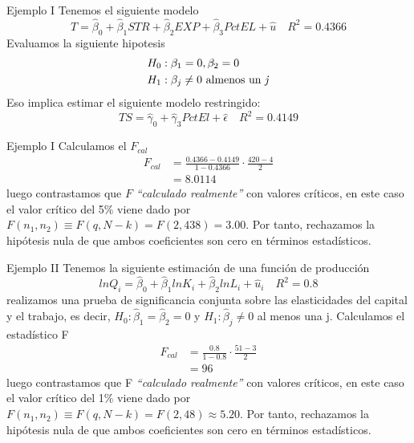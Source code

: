\begin{frame}{Ejemplo I}
	Tenemos el siguiente modelo
		$$T = \widehat{\beta}_0 + \widehat{\beta}_1 STR + \widehat{\beta}_2 EXP + \widehat{\beta}_3 PctEL + \widehat{u} \quad R^2=0.4366$$
	Evaluamos la siguiente hipotesis
	\begin{align*}
		H_0 &: \beta_1 = 0, \beta_2 = 0\\
		H_1 &: \beta_j \neq 0 \textup{ almenos un \textit{j}}
	\end{align*}
	Eso implica estimar el siguiente modelo restringido:
		$$TS = \widehat{\gamma}_0 + \widehat{\gamma}_3 PctEl + \widehat{\epsilon} \quad R^2 = 0.4149$$
\end{frame}
\begin{frame}{Ejemplo I}
	Calculamos el $F_{cal}$
		\begin{align*}
			F_{cal} & = \frac{0.4366 - 0.4149}{1 - 0.4366} \cdot \frac{420 - 4}{2} \\
			& = 8.0114
		\end{align*}
	luego contrastamos que $F$ \textit{``calculado realmente''} con valores críticos, en este caso el valor crítico del 5\% viene dado por $F (n_1, n_2) \equiv F (q, N - k) = F (2, 438) = 3.00$. Por tanto, rechazamos la hipótesis nula de que ambos coeficientes son cero en términos estadísticos.
\end{frame}
\begin{frame}{Ejemplo II}
	Tenemos la siguiente estimación de una función de producción
		$$ln Q_i = \widehat{\beta}_0 + \widehat{\beta}_1 ln K_i + \widehat{\beta}_2 ln L_i + \widehat{u}_i \quad R^2=0.8$$
	realizamos una prueba de significancia conjunta sobre las elasticidades del capital y el trabajo, es decir, $H_0: \widehat{\beta}_1 = \widehat{\beta}_2 = 0$ y $H_1: \widehat{\beta}_j \neq 0$ al menos una j. Calculamos el estadístico F
	\begin{align*}
		F_{cal} & = \frac{0.8}{1-0.8}\cdot \frac{51 - 3}{2}\\
				& = 96
	\end{align*}
	luego contrastamos que F \textit{``calculado realmente''} con valores críticos, en este caso el valor crítico del 1\% viene dado por $F (n_1, n_2) \equiv F (q, N - k) = F (2, 48) \approx 5.20$. Por tanto, rechazamos la hipótesis nula de que ambos coeficientes son cero en términos estadísticos.
\end{frame}

